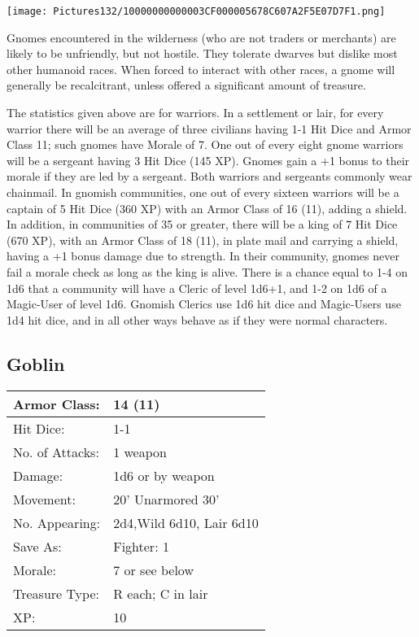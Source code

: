 \documentclass[a4paper,twoside,openany,10pt]{book}
\begin{document}
\begin{multicols}{2}
\begin{center}
	\texttt{[image: Pictures132/10000000000003CF000005678C607A2F5E07D7F1.png]}
\end{center}

Gnomes encountered in the wilderness (who are not traders or merchants) are likely to be unfriendly, but not hostile. They tolerate dwarves but dislike most other humanoid races. When forced to interact with other races, a gnome will generally be recalcitrant, unless offered a significant amount of treasure.

The statistics given above are for warriors. In a settlement or lair, for every warrior there will be an average of three civilians having 1-1 Hit Dice and Armor Class 11; such gnomes have Morale of 7. One out of every eight gnome warriors will be a sergeant having 3 Hit Dice (145 XP). Gnomes gain a +1 bonus to their morale if they are led by a sergeant. Both warriors and sergeants commonly wear chainmail. In gnomish communities, one out of every sixteen warriors will be a captain of 5 Hit Dice (360 XP) with an Armor Class of 16 (11), adding a shield. In addition, in communities of 35 or greater, there will be a king of 7 Hit Dice (670 XP), with an Armor Class of 18 (11), in plate mail and carrying a shield, having a +1 bonus damage due to strength. In their community, gnomes never fail a morale check as long as the king is alive. There is a chance equal to 1-4 on 1d6 that a community will have a Cleric of level 1d6+1, and 1-2 on 1d6 of a Magic-User of level 1d6. Gnomish Clerics use 1d6 hit dice and Magic-Users use 1d4 hit dice, and in all other ways behave as if they were normal characters.

\subsection*{Goblin}\label{goblin}

\begin{tabularx}{0.48\textwidth}{@{}lX@{}}
Armor Class: & 14 (11) \\\hline
Hit Dice: & 1-1 \\\hline
No. of Attacks: & 1 weapon \\\hline
Damage: & 1d6 or by weapon \\\hline
Movement: & 20' Unarmored 30' \\\hline
No. Appearing: & 2d4,Wild 6d10, Lair 6d10 \\\hline
Save As: & Fighter: 1 \\\hline
Morale: & 7 or see below \\\hline
Treasure Type: & R each; C in lair \\\hline
XP: & 10 \\\hline
\end{tabularx}\medskip



\end{multicols}
\end{document}
